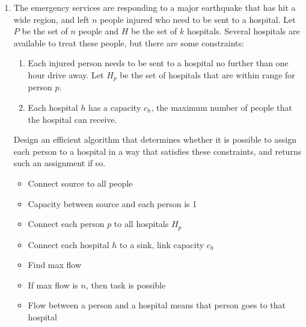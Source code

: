 \documentclass[a4paper]{article}
\begin{document}
\begin{enumerate}
		\item The emergency services are responding to a major earthquake that has hit a wide region, and left $n$ people injured who need to be sent to a hospital. Let $P$ be the set of $n$ people and $H$ be the set of $k$ hospitals. Several hospitals are available to treat these people, but there are some constraints:
				\begin{enumerate}[label={(\alph*)}]
						\item Each injured person needs to be sent to a hospital no further than one hour drive away. Let $H_p$ be the set of hospitals that are within range for person $p$.
						\item Each hospital $h$ has a capacity $c_h$, the maximum number of people that the hospital can receive.
				\end{enumerate}
				Design an efficient algorithm that determines whether it is possible to assign each person to a hospital in a way that satisfies these constraints, and returns such an assignment if so.
				
				\begin{itemize}
						\item Connect source to all people
						\item Capacity between source and each person is 1
						\item Connect each person $p$ to all hospitals $H_p$
						\item Connect each hospital $h$ to a sink, link capacity $c_h$
						\item Find max flow
						\item If max flow is $n$, then task is possible
						\item Flow between a person and a hospital means that person goes to that hospital
				\end{itemize}
\end{enumerate}
\end{document}
